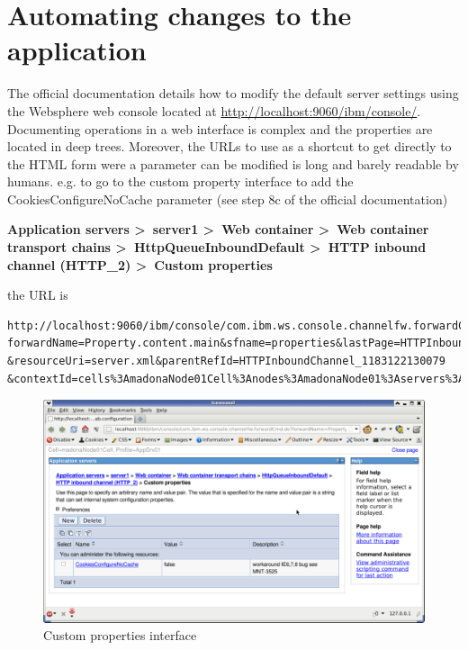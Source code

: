 \documentclass[10pt,a4]{article}
\begin{document}
\section{Automating changes to the application}
The official documentation details how to modify the default server settings using the Websphere web console located at \url{http://localhost:9060/ibm/console/}. Documenting operations in a web interface is complex and the properties are located in deep trees. Moreover, the URLs to use as a shortcut to get directly to the HTML form were a parameter can be modified is long and barely readable by humans. e.g. to go to the custom property interface to add the CookiesConfigureNoCache parameter (see step 8c of the official documentation)

{\bf
Application servers \textgreater\ server1 \textgreater\ Web container \textgreater\ Web container transport chains \textgreater\ HttpQueueInboundDefault \textgreater\ HTTP inbound channel (HTTP\_2) \textgreater\ Custom properties
}

the URL is

\begin{verbatim}
http://localhost:9060/ibm/console/com.ibm.ws.console.channelfw.forwardCmd.do?
forwardName=Property.content.main&sfname=properties&lastPage=HTTPInboundChannel.config.view
&resourceUri=server.xml&parentRefId=HTTPInboundChannel_1183122130079
&contextId=cells%3AmadonaNode01Cell%3Anodes%3AmadonaNode01%3Aservers%3Aserver1&perspective=tab.configuration
\end{verbatim}


\begin{figure}[htb]
\begin{center}
\includegraphics[width=130mm]{cookie}
\caption{Custom properties interface}
\label{sc1}
\end{center}
\end{figure}
\end{document}
